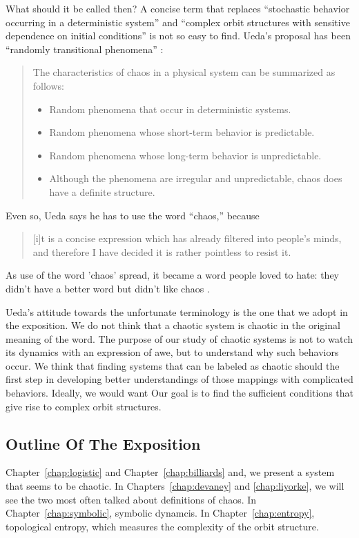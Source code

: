 \documentclass[10pt,twoside]{book}
\begin{document}
What should it be called then?
A concise term that replaces ``stochastic behavior occurring in a deterministic system'' and ``complex orbit structures with sensitive dependence on initial conditions'' is not so easy to find.
Ueda's proposal has been ``randomly transitional phenomena'' \citep[p.24]{ueda-abraham}:
\begin{quotation}
  The characteristics of chaos in a physical system can be summarized as follows:
  \begin{itemize}
    \item Random phenomena that occur in deterministic systems.
    \item Random phenomena whose short-term behavior is predictable.
    \item Random phenomena whose long-term behavior is unpredictable.
    \item Although the phenomena are irregular and unpredictable, chaos does have a definite structure.
  \end{itemize}
\end{quotation}
Even so, Ueda says he has to use the word ``chaos,'' because
\begin{quotation}
  [i]t is a concise expression which has already filtered into people's minds, and therefore I have decided it is rather pointless to resist it.
\end{quotation}
As use of the word 'chaos' spread, it became a word people loved to hate: they didn't have a better word but didn't like chaos \citep[p.205]{ueda-abraham}.

Ueda's attitude towards the unfortunate terminology is the one that we adopt in the exposition.
We do not think that a chaotic system is chaotic in the original meaning of the word.
The purpose of our study of chaotic systems is not to watch its dynamics with an expression of awe, but to understand why such behaviors occur.
We think that finding systems that can be labeled as chaotic should the first step in developing better understandings of those mappings with complicated behaviors.
Ideally, we would want Our goal is to find the sufficient conditions that give rise to complex orbit structures.


\subsection*{Outline Of The Exposition}
Chapter~\ref{chap:logistic} and Chapter~\ref{chap:billiards} and, we present a system that seems to be chaotic.
In Chapters~\ref{chap:devaney} and \ref{chap:liyorke}, we will see the two most often talked about definitions of chaos.
In Chapter~\ref{chap:symbolic}, symbolic dynamcis.
In Chapter~\ref{chap:entropy}, topological entropy, which measures the complexity of the orbit structure.
\end{document}
